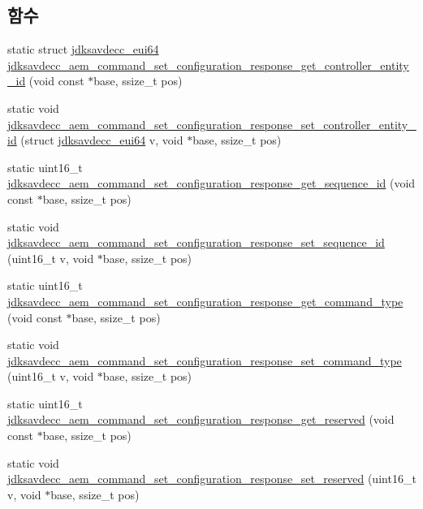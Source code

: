 \subsection*{함수}
\begin{DoxyCompactItemize}
\item 
static struct \hyperlink{structjdksavdecc__eui64}{jdksavdecc\+\_\+eui64} \hyperlink{group__command__set__configuration__response_ga305598710c9fcb57c5de121e19b44513}{jdksavdecc\+\_\+aem\+\_\+command\+\_\+set\+\_\+configuration\+\_\+response\+\_\+get\+\_\+controller\+\_\+entity\+\_\+id} (void const $\ast$base, ssize\+\_\+t pos)
\item 
static void \hyperlink{group__command__set__configuration__response_ga2184873d7e58f42ca80688c94ad41526}{jdksavdecc\+\_\+aem\+\_\+command\+\_\+set\+\_\+configuration\+\_\+response\+\_\+set\+\_\+controller\+\_\+entity\+\_\+id} (struct \hyperlink{structjdksavdecc__eui64}{jdksavdecc\+\_\+eui64} v, void $\ast$base, ssize\+\_\+t pos)
\item 
static uint16\+\_\+t \hyperlink{group__command__set__configuration__response_ga7198a9cbde362b7414dcdb0f11ae945d}{jdksavdecc\+\_\+aem\+\_\+command\+\_\+set\+\_\+configuration\+\_\+response\+\_\+get\+\_\+sequence\+\_\+id} (void const $\ast$base, ssize\+\_\+t pos)
\item 
static void \hyperlink{group__command__set__configuration__response_ga8c16fc9beef258c454a16cb70938797b}{jdksavdecc\+\_\+aem\+\_\+command\+\_\+set\+\_\+configuration\+\_\+response\+\_\+set\+\_\+sequence\+\_\+id} (uint16\+\_\+t v, void $\ast$base, ssize\+\_\+t pos)
\item 
static uint16\+\_\+t \hyperlink{group__command__set__configuration__response_ga8f1d87f51b42cf993e5ab0a05e5db3a9}{jdksavdecc\+\_\+aem\+\_\+command\+\_\+set\+\_\+configuration\+\_\+response\+\_\+get\+\_\+command\+\_\+type} (void const $\ast$base, ssize\+\_\+t pos)
\item 
static void \hyperlink{group__command__set__configuration__response_ga28bf27c12718fe72953d815b4528ac6c}{jdksavdecc\+\_\+aem\+\_\+command\+\_\+set\+\_\+configuration\+\_\+response\+\_\+set\+\_\+command\+\_\+type} (uint16\+\_\+t v, void $\ast$base, ssize\+\_\+t pos)
\item 
static uint16\+\_\+t \hyperlink{group__command__set__configuration__response_ga892304b0ed7b0133a84d7ec6c0622cd5}{jdksavdecc\+\_\+aem\+\_\+command\+\_\+set\+\_\+configuration\+\_\+response\+\_\+get\+\_\+reserved} (void const $\ast$base, ssize\+\_\+t pos)
\item 
static void \hyperlink{group__command__set__configuration__response_gab99c434cfdbc9b1c987a75d1d3c5f8e0}{jdksavdecc\+\_\+aem\+\_\+command\+\_\+set\+\_\+configuration\+\_\+response\+\_\+set\+\_\+reserved} (uint16\+\_\+t v, void $\ast$base, ssize\+\_\+t pos)

\end{DoxyCompactItemize}
